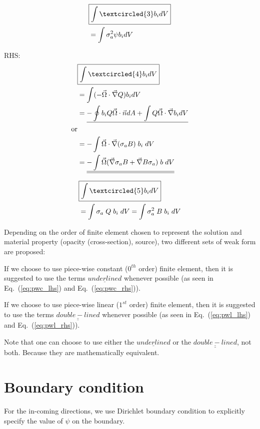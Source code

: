 \documentclass{article}
\newcommand{\grad}{\vec{\nabla}}
\newcommand{\vo}{\vec{\Omega}}
\newcommand{\vn}{\vec{n}}
\newcommand{\eqt}[1]{Eq.~(\ref{#1})}                     %
\begin{document}
\begin{align}
 & \boxed{\int\textcircled{3}b_i dV} \nonumber\\
 &= \int\sigma_a^2\psi b_i dV
\end{align} 
 
 
RHS:
\begin{align}
 & \boxed{\int\textcircled{4}b_i dV} \nonumber\\
 &= \int (-\vo\cdot\grad Q)b_i dV  \\
 &= \underline{-\oint b_iQ\vo\cdot\vn dA + \int Q\vo\cdot\grad b_i dV} \label{eq:pwc_rhs}\\
 \text{or} \\
 &= -\int\vo\cdot\grad(\sigma_a B)\;b_i\; dV \\
 &= \underline{\underline{-\int\vo(\grad\sigma_a B + \grad B\sigma_a)\;b\;dV}} \label{eq:pwl_rhs}
\end{align}

\begin{align}
 & \boxed{\int\textcircled{5}b_i dV} \nonumber\\
 &= \int\sigma_a\;Q\;b_i\;dV = \int\sigma_a^2\;B\;b_i\;dV
\end{align}

Depending on the order of finite element chosen to represent the solution and material property (opacity (cross-section), source), two different sets of weak form are proposed:

If we choose to use piece-wise constant ($0^{th}$ order) finite element, then it is suggested to use the terms $\underline{underlined}$ whenever possible (as seen in \eqt{eq:pwc_lhs} and \eqt{eq:pwc_rhs}).

If we choose to use piece-wise linear ($1^{st}$ order) finite element, then it is suggested to use the terms $\underline{\underline{double-lined}}$ whenever possible (as seen in \eqt{eq:pwl_lhs} and \eqt{eq:pwl_rhs}).

Note that one can choose to use either the $\underline{underlined}$ or the $\underline{\underline{double-lined}}$, not both. Because they are mathematically equivalent.

\section{Boundary condition}
For the in-coming directions, we use Dirichlet boundary condition to explicitly specify the value of $\psi$ on the boundary.
\end{document}
